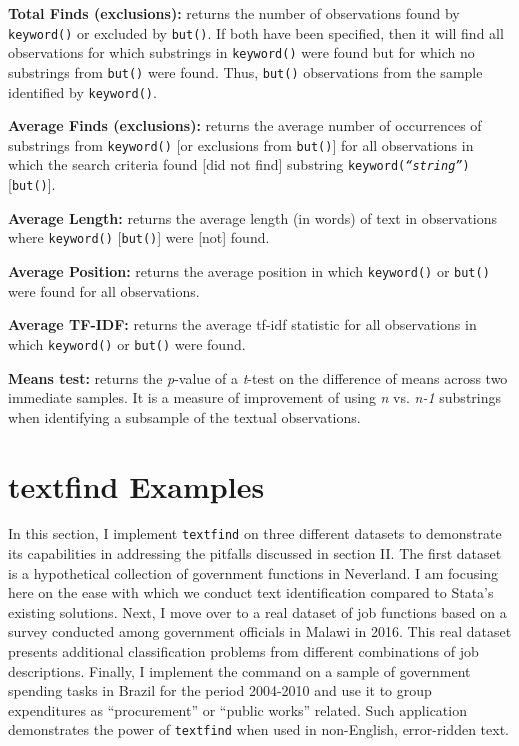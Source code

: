 \hangpara
{\bf Total Finds (exclusions):} returns the number of observations found by {\tt keyword()} or excluded by {\tt but()}. If both have been specified, then it will find all observations for which substrings in {\tt keyword()} were found but for which no substrings from {\tt but()} were found. Thus, {\tt but()}  observations from the sample identified by {\tt keyword()}.

\hangpara
{\bf Average Finds (exclusions):} returns the average number of occurrences of substrings from {\tt keyword()} [or exclusions from {\tt but()}] for all observations in which the search criteria found [did not find] substring {\tt keyword({\it ``string''})} [{\tt but()}].

\hangpara
{\bf Average Length:} returns the average length (in words) of text in observations where {\tt keyword()} [{\tt but()}] were [not] found.

\hangpara
{\bf Average Position:} returns the average position in which {\tt keyword()} or {\tt but()} were found for all observations.

\hangpara
{\bf Average TF-IDF:} returns the average tf-idf statistic for all observations in which {\tt keyword()} or {\tt but()} were found.

\hangpara
{\bf Means test:} returns the {\it p}-value of a {\it t}-test on the difference of means across two immediate samples. It is a measure of improvement of using {\it n} vs. {\it n-1} substrings when identifying a subsample of the textual observations.

\section[Examples]{textfind Examples}
In this section, I implement {\tt textfind} on three different datasets to demonstrate its capabilities in addressing the pitfalls discussed in section II. The first dataset is a hypothetical collection of government functions in Neverland. I am focusing here on the ease with which we conduct text identification compared to Stata's existing solutions. Next, I move over to a real dataset of job functions based on a survey conducted among government officials in Malawi in 2016. This real dataset presents additional classification problems from different combinations of job descriptions. Finally, I implement the command on a sample of government spending tasks in Brazil for the period 2004-2010 and use it to group expenditures as ``procurement'' or ``public works'' related. Such application demonstrates the power of {\tt textfind} when used in non-English, error-ridden text.


